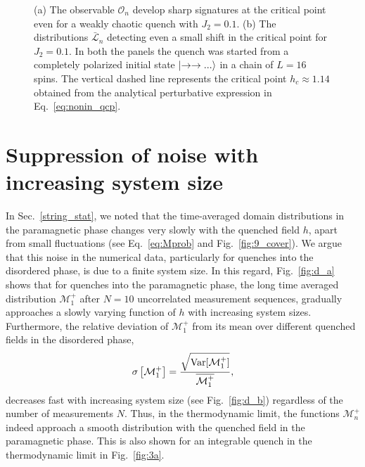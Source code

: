 \documentclass[aps,prx,twocolumn]{revtex4-2}
\begin{document}
{{\begin{figure*}
	\hspace{1cm}
	
	\caption{ {(a) The observable $\mathcal{O}_n$ develop sharp signatures at the critical point even for a weakly chaotic quench with $J_2=0.1$. (b) The distributions $\bar{\mathcal{L}}_n$ detecting even a small shift in the critical point for $J_2=0.1$. In both the panels the quench was started from a completely polarized initial state $\ket{\rightarrow\rightarrow...}$ in a chain of $L=16$ spins. The vertical dashed line represents the critical point $h_c\approx 1.14$ obtained from the analytical perturbative expression in Eq.~\eqref{eq:nonin_qcp}.}}
	\label{fig:weak}
\end{figure*}

\section{Suppression of noise with increasing system size}
\label{sec:noise}

In Sec.~\ref{string_stat}, we noted that the time-averaged domain distributions in the paramagnetic phase changes very slowly with the quenched field $h$, apart from small fluctuations (see Eq.~\eqref{eq:Mprob} and Fig.~\ref{fig:9_cover}). We argue that this noise in the numerical data, particularly for quenches into the disordered phase, is due to a finite system size. In this regard, Fig.~\ref{fig:d_a} shows that for quenches into the paramagnetic phase, the long time averaged distribution $\mathcal{M}_1^+$ after $N=10$ uncorrelated measurement sequences, gradually approaches a slowly varying function of $h$ with increasing system sizes. Furthermore, the relative deviation of $\mathcal{M}_1^+$ from its mean over different quenched fields in the disordered phase,
\begin{equation}
	\sigma\left[\mathcal{M}_1^+\right]= \frac{\sqrt{{\rm Var}[\mathcal{M}_1^+]}}{\overline{\mathcal{M}_1^+}},
\end{equation}
decreases fast with increasing system size (see Fig.~\ref{fig:d_b}) regardless of the number of measurements $N$. Thus, in the thermodynamic limit, the functions $\mathcal{M}_n^+$ indeed approach a smooth distribution with the quenched field in the paramagnetic phase. This is also shown for an integrable quench in the thermodynamic limit in Fig.~\ref{fig:3a}.


}}
\end{document}
